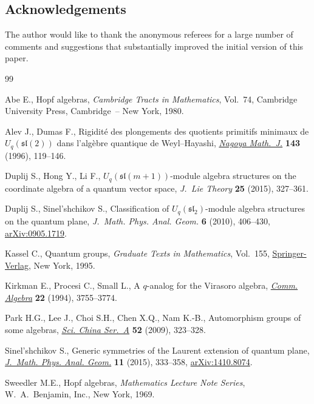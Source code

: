 \documentclass[10pt,a4paper]{amsart}
\providecommand{\LastPageEnding}{}
\numberwithin{equation}{section}
\begin{document}
\subsection*{Acknowledgements}

The author would like to thank the anonymous referees for a large number of comments and suggestions that substantially improved the initial version of this paper.


\begin{thebibliography}{99}
\footnotesize\itemsep=0pt

Abe E., Hopf algebras, \textit{Cambridge Tracts in Mathematics}, Vol.~74,
 Cambridge University Press, Cambridge~-- New York, 1980.

Alev J., Dumas F., Rigidit\'{e} des plongements des quotients primitifs
 minimaux de {$U_q(\mathfrak{sl}(2))$} dans l'alg\`ebre quantique de
 {W}eyl--{H}ayashi, \href{https://doi.org/10.1017/S002776300000595X}{\textit{Nagoya Math.~J.}} \textbf{143} (1996), 119--146.

Duplij S., Hong Y., Li F., {$U_q(\mathfrak{sl}(m+1))$}-module algebra
 structures on the coordinate algebra of a quantum vector space,
 \textit{J.~Lie Theory} \textbf{25} (2015), 327--361.

Duplij S., Sinel'shchikov S., Classification of {$U_q(\mathfrak{sl}_2)$}-module
 algebra structures on the quantum plane, \textit{J.~Math. Phys. Anal. Geom.}
 \textbf{6} (2010), 406--430, \href{http://arxiv.org/abs/0905.1719}{arXiv:0905.1719}.

Kassel C., Quantum groups, \textit{Graduate Texts in Mathematics}, Vol.~155,
 \href{https://doi.org/10.1007/978-1-4612-0783-2}{Springer-Verlag}, New York, 1995.

Kirkman E., Procesi C., Small L., A {$q$}-analog for the {V}irasoro algebra,
 \href{https://doi.org/10.1080/00927879408825052}{\textit{Comm. Algebra}} \textbf{22} (1994), 3755--3774.

Park H.G., Lee J., Choi S.H., Chen X.Q., Nam K.-B., Automorphism groups of some
 algebras, \href{https://doi.org/10.1007/s11425-009-0007-9}{\textit{Sci. China Ser.~A}} \textbf{52} (2009), 323--328.

Sinel'shchikov S., Generic symmetries of the {L}aurent extension of quantum
 plane, \href{https://doi.org/10.15407/mag11.04.333}{\textit{J.~Math. Phys. Anal. Geom.}} \textbf{11} (2015), 333--358,
 \href{http://arxiv.org/abs/1410.8074}{arXiv:1410.8074}.

Sweedler M.E., Hopf algebras, \textit{Mathematics Lecture Note Series}, W.~A.~Benjamin,
 Inc., New York, 1969.

\end{thebibliography}\LastPageEnding
\end{document}
